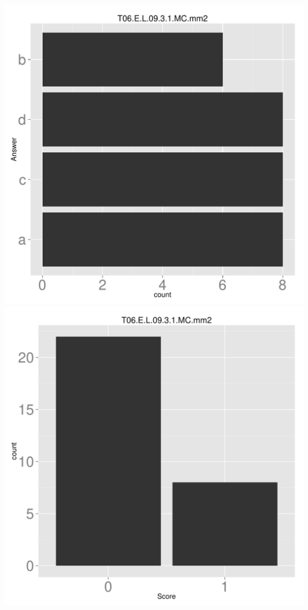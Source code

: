 \documentclass[12pt,nohyper]{tufte-handout}\usepackage[]{graphicx}\usepackage[]{color}
\begin{document}
\begin{center} \includegraphics[width=.45\linewidth]{Topic06_40_answer} \includegraphics[width=.45\linewidth]{Topic06_40_score} \end{center} 
\end{document}
